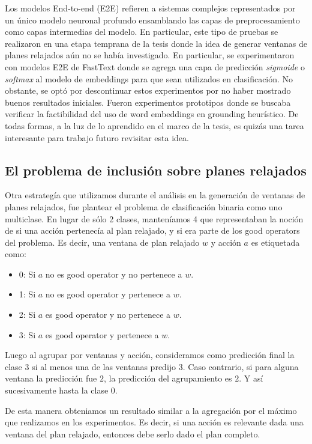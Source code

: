 Los modelos End-to-end (E2E) refieren a sistemas complejos representados por un
único modelo neuronal profundo ensamblando las capas de preprocesamiento como
capas intermedias del modelo. En particular, este tipo de pruebas se realizaron
en una etapa temprana de la tesis donde la idea de generar ventanas de planes
relajados aún no se había investigado. En particular, se experimentaron con
modelos E2E de FastText donde se agrega una capa de predicción \emph{sigmoide} o
\emph{softmax} al modelo de embeddings para que sean utilizados en
clasificación. No obstante, se optó por descontinuar estos experimentos por no
haber mostrado buenos resultados iniciales. Fueron experimentos prototipos donde
se buscaba verificar la factibilidad del uso de word embeddings en grounding
heurístico. De todas formas, a la luz de lo aprendido en el marco de la tesis,
es quizás una tarea interesante para trabajo futuro revisitar esta idea.

\subsection{El problema de inclusión sobre planes relajados}

Otra estrategía que utilizamos durante el análisis en la generación de ventanas
de planes relajados, fue plantear el problema de clasificación binaria como uno
multiclase. En lugar de sólo 2 clases, manteníamos 4 que representaban la noción
de si una acción pertenecía al plan relajado, y si era parte de los good
operators del problema. Es decir, una ventana de plan relajado $w$ y acción $a$
es etiquetada como:

\begin{itemize}
    \item 0: Si $a$ no es good operator y no pertenece a $w$.
    \item 1: Si $a$ no es good operator y pertenece a $w$.
    \item 2: Si $a$ es good operator y no pertenece a $w$.
    \item 3: Si $a$ es good operator y pertenece a $w$.
\end{itemize}

Luego al agrupar por ventanas y acción, consideramos como predicción final la
clase $3$ si al menos una de las ventanas predijo $3$. Caso contrario, si para
alguna ventana la predicción fue $2$, la predicción del agrupamiento es $2$. Y así
sucesivamente hasta la clase $0$.

De esta manera obteniamos un resultado similar a la agregación por el máximo que
realizamos en los experimentos. Es decir, si una acción es relevante dada una
ventana del plan relajado, entonces debe serlo dado el plan completo.

